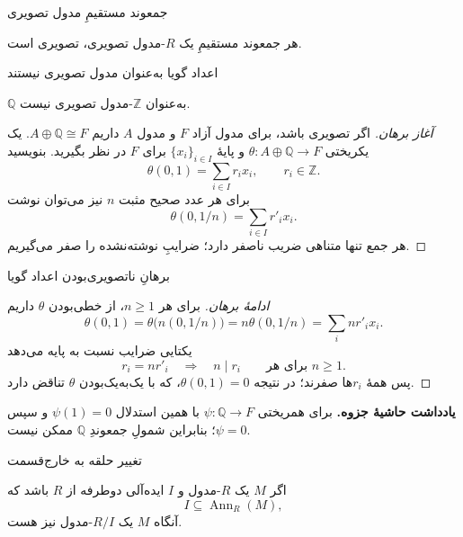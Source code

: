 \begin{frame}[t]{جمعوند مستقیمِ مدول تصویری}
\label{lec17:projective-summand-corollary}
\begin{corollary}
هر جمعوند مستقیمِ یک $R$-مدول تصویری، تصویری است.
\end{corollary}
\end{frame}

\begin{frame}[t]{اعداد گویا به‌عنوان مدول تصویری نیستند}
\label{lec17:rationals-not-projective}
\begin{example}
$\mathbb Q$ به‌عنوان $\mathbb Z$-مدول تصویری نیست.
\end{example}
\begin{proof}[آغاز برهان]
اگر تصویری باشد، برای مدول آزاد $F$ و مدول $A$ داریم
$A\oplus\mathbb Q\cong F$.
یک یکریختی $\theta:A\oplus\mathbb Q\to F$ و پایهٔ
$\{x_i\}_{i\in I}$ برای $F$ در نظر بگیرید. بنویسید
\[
\theta(0,1)=\sum_{i\in I}r_ix_i,\qquad r_i\in\mathbb Z.
\]
برای هر عدد صحیح مثبت $n$ نیز می‌توان نوشت
\[
\theta(0,1/n)=\sum_{i\in I}r'_ix_i.
\]
هر جمع تنها متناهی ضریب ناصفر دارد؛ ضرایبِ نوشته‌نشده را صفر می‌گیریم.
\end{proof}
\end{frame}

\begin{frame}[t]{برهانِ ناتصویری‌بودن اعداد گویا}
\label{lec17:rationals-coefficients}
\begin{proof}[ادامهٔ برهان]
برای هر $n\ge1$، از خطی‌بودن $\theta$ داریم
\[
\theta(0,1)=\theta\bigl(n(0,1/n)\bigr)
=n\theta(0,1/n)=\sum_i nr'_ix_i.
\]
یکتایی ضرایب نسبت به پایه می‌دهد
\[
r_i=nr'_i\quad\Longrightarrow\quad n\mid r_i
\qquad\text{برای هر }n\ge1.
\]
پس همهٔ $r_i$ها صفرند؛ در نتیجه $\theta(0,1)=0$،
که با یک‌به‌یک‌بودن $\theta$ تناقض دارد.
\end{proof}
\textbf{یادداشت حاشیهٔ جزوه.}
برای همریختی $\psi:\mathbb Q\to F$ با همین استدلال
$\psi(1)=0$ و سپس $\psi=0$؛ بنابراین شمولِ جمعوندِ $\mathbb Q$ ممکن نیست.
\end{frame}

\begin{frame}[t]{تغییر حلقه به خارج‌قسمت}
\label{lec17:quotient-ring-module}
\begin{remark}
اگر $M$ یک $R$-مدول و $I$ ایده‌آلی دوطرفه از $R$ باشد که
\[
I\subseteq\operatorname{Ann}_R(M),
\]
آنگاه $M$ یک $R/I$-مدول نیز هست.
\end{remark}
\end{frame}

